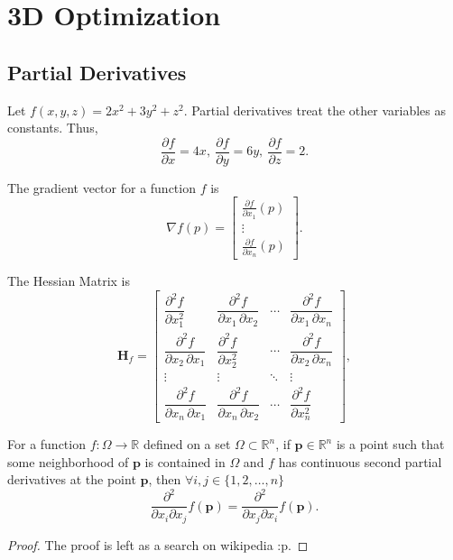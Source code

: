 \chapter{3D Optimization}
\section{Partial Derivatives}
Let $f(x,y,z) = 2x^2+3y^2+z^2$. Partial derivatives treat the other variables as constants.
Thus, $$\frac{\partial f}{\partial x} = 4x, ~ \frac{\partial f}{\partial y} = 6y, ~ \frac{\partial f}{\partial z} = 2.$$
\begin{definition}
The \alert{gradient vector} for a function $f$ is $${\displaystyle \nabla f(p)={\begin{bmatrix}{\frac {\partial f}{\partial x_{1}}}(p)\\\vdots \\{\frac {\partial f}{\partial x_{n}}}(p)\end{bmatrix}}.}$$
\end{definition}
\begin{definition}
The \alert{Hessian Matrix} is 
$${\displaystyle \mathbf {H} _{f}={\begin{bmatrix}{\dfrac {\partial ^{2}f}{\partial x_{1}^{2}}}&{\dfrac {\partial ^{2}f}{\partial x_{1}\,\partial x_{2}}}&\cdots &{\dfrac {\partial ^{2}f}{\partial x_{1}\,\partial x_{n}}}\\[2.2ex]{\dfrac {\partial ^{2}f}{\partial x_{2}\,\partial x_{1}}}&{\dfrac {\partial ^{2}f}{\partial x_{2}^{2}}}&\cdots &{\dfrac {\partial ^{2}f}{\partial x_{2}\,\partial x_{n}}}\\[2.2ex]\vdots &\vdots &\ddots &\vdots \\[2.2ex]{\dfrac {\partial ^{2}f}{\partial x_{n}\,\partial x_{1}}}&{\dfrac {\partial ^{2}f}{\partial x_{n}\,\partial x_{2}}}&\cdots &{\dfrac {\partial ^{2}f}{\partial x_{n}^{2}}}\end{bmatrix}},}$$
\end{definition}

\begin{theorem}
    For a function $f:\Omega \rightarrow \mathbb{R}$ defined on a set $\Omega \subset \mathbb{R}^n$, if $\mathbf{p} \in
    \mathbb{R}^n$ is a point such that some neighborhood of $\mathbf{p}$ is contained in $\Omega$ and $f$ has continuous
    second partial derivatives at the point $\mathbf{p}$, then $\forall i,j \in \{1,2,\dots,n\}$
    $$\frac{\partial^2}{\partial x_i \partial x_j}f(\mathbf{p})=\frac{\partial^2}{\partial x_j\partial x_i}f(\mathbf{p}).$$
\end{theorem}
\begin{proof}
    The proof is left as a search on wikipedia :p.
\end{proof}

